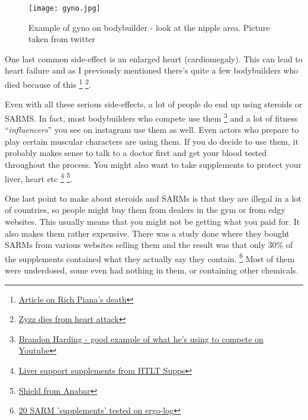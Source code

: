 \documentclass[openany, 12pt]{book}
\begin{document}
	\begin{figure}[h]
		\centering
		\texttt{[image: gyno.jpg]}
		\caption{Example of gyno on bodybuilder - look at the nipple area. Picture taken from twitter}
		\label{fig8}
	\end{figure}

        One last common side-effect is an enlarged heart (cardiomegaly). This can lead to heart failure and as I previously mentioned there's quite a few bodybuilders who died because of this
        \footnote{\href{https://www.menshealth.com/trending-news/a19541843/bodybuilder-rich-piana-autopsy-report/}{Article on Rich Piana's death}}
        \footnote{\href{https://www.dailytelegraph.com.au/news/nsw/bodybuilder-aziz-zyzz-shavershian-killed-by-heart-defect/news-story/57bbadf89f78c5d678d4df0c5b35d0d5}
        {Zyzz dies from heart attack}}.
        
        Even with all these serious side-effects, a lot of people do end up using steroids or SARMS. In fact, most bodybuilders who compete use them
        \footnote{\href{https://www.youtube.com/watch?v=k8mBn3Dp7h4}{Brandon Harding - good example of what he's using to compete on Youtube}}
        and a lot of fitness ``\textit{influencers}''
        you see on instagram use them as well. Even actors who prepare to play certain muscular characters are using them. If you do decide to use them, it probably makes sense to talk to a
        doctor first and get your blood tested throughout the process. You might also want to take supplements to protect your liver, heart etc
        \footnote{\href{https://www.htltsupps.com/collections/capsules/products/liver-support/}{Liver support supplements from HTLT Supps}}
        \footnote{\href{https://theanabar.com/products/shield?variant=33058384969837/}{Shield from Anabar}}.

        One last point to make about steroids and SARMs is that they are illegal in a lot of countries, so people might buy them from dealers in the gym or from edgy websites. This usually means
        that you might not be getting what you paid for. It also makes them rather expensive. There was a study done where they bought SARMs from various websites selling them and the result was that
        only 30\% of the supplements contained what they actually say they contain.
        \footnote{\href{https://ergo-log.com/20-sarm-supplements-tested.html}{20 SARM 'supplements' tested on ergo-log}}
        Most of them were underdosed, some even had nothing in them, or containing other chemicals.
\end{document}
